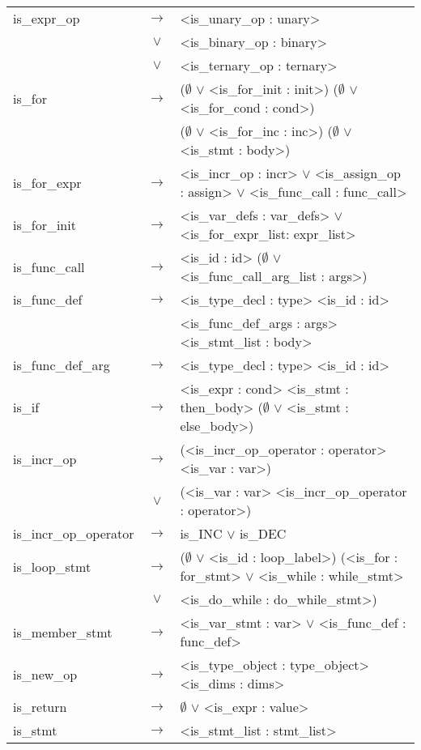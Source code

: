 \documentclass[a4paper]{article}
\begin{document}
\begin{tabular}{lcl}
	is\_expr\_op				& $\to$ & <is\_unary\_op : unary> \\
								& $\vee$ & <is\_binary\_op : binary>\\
								& $\vee$ & <is\_ternary\_op : ternary>\\
	is\_for						& $\to$ & ($\emptyset$ $\vee$ <is\_for\_init : init>) ($\emptyset$ $\vee$ <is\_for\_cond : cond>) \\ %
								&       & ($\emptyset$ $\vee$ <is\_for\_inc : inc>) ($\emptyset$ $\vee$ <is\_stmt : body>) \\
	is\_for\_expr				& $\to$ & <is\_incr\_op : incr> $\vee$ <is\_assign\_op : assign> $\vee$ <is\_func\_call : func\_call> \\
	is\_for\_init				& $\to$ & <is\_var\_defs : var\_defs> $\vee$ <is\_for\_expr\_list: expr\_list> \\
	is\_func\_call				& $\to$ & <is\_id : id> ($\emptyset$ $\vee$ <is\_func\_call\_arg\_list : args>) \\
	is\_func\_def				& $\to$ & <is\_type\_decl : type> <is\_id : id> \\ %
								&       & <is\_func\_def\_args : args> <is\_stmt\_list : body> \\
	is\_func\_def\_arg			& $\to$ & <is\_type\_decl : type> <is\_id : id> \\
	is\_if						& $\to$ & <is\_expr : cond> <is\_stmt : then\_body> ($\emptyset$ $\vee$ <is\_stmt : else\_body>) \\
	is\_incr\_op				& $\to$ &(<is\_incr\_op\_operator : operator> <is\_var : var>) \\
								& $\vee$ & (<is\_var : var> <is\_incr\_op\_operator : operator>) \\
	is\_incr\_op\_operator		& $\to$ & is\_INC $\vee$ is\_DEC \\
	is\_loop\_stmt				& $\to$ & ($\emptyset$ $\vee$ <is\_id : loop\_label>) (<is\_for : for\_stmt> $\vee$ <is\_while : while\_stmt> \\ 
								& $\vee$ & <is\_do\_while : do\_while\_stmt>) \\
	is\_member\_stmt			& $\to$ & <is\_var\_stmt : var> $\vee$ <is\_func\_def : func\_def> \\
	is\_new\_op					& $\to$ & <is\_type\_object : type\_object> <is\_dims : dims> \\
	is\_return					& $\to$ & $\emptyset$ $\vee$ <is\_expr : value> \\
	is\_stmt					& $\to$ & <is\_stmt\_list : stmt\_list> \\

\end{tabular}
\end{document}
